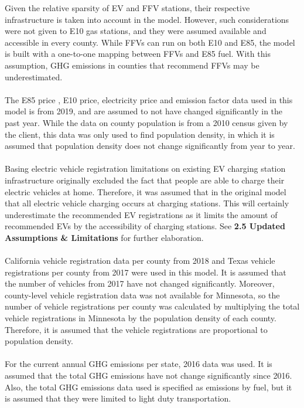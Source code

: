 \documentclass[answers]{exam}
\begin{document}
Given the relative sparsity of EV and FFV stations, their respective infrastructure is taken into account in the model. However, such considerations were not given to E10 gas stations, and they were assumed available and accessible in every county. While FFVs can run on both E10 and E85, the model is built with a one-to-one mapping between FFVs and E85 fuel. With this assumption, GHG emissions in counties that recommend FFVs may be underestimated. 
\\ ~\\
 The E85 price \cite{E85 Prices}, E10 price, electricity price and emission factor data used in this model is from 2019, and are assumed to not have changed significantly in the past year. While the data on county population is from a 2010 census given by the client, this data was only used to find population density, in which it is assumed that population density does not change significantly from year to year. 
\\ ~\\
Basing electric vehicle registration limitations on existing EV charging station infrastructure originally excluded the fact that people are able to charge their electric vehicles at home. Therefore, it was assumed that in the original model that all electric vehicle charging occurs at charging stations. This will certainly underestimate the recommended EV registrations as it limits the amount of recommended EVs by the accessibility of charging stations. See \textbf{2.5 Updated Assumptions \& Limitations} for further elaboration.
\\ ~\\
California vehicle registration data per county from 2018\cite{cadmv} and Texas vehicle registrations per county from 2017\cite{txdmv} were used in this model.
It is assumed that the number of vehicles from 2017 have not changed significantly. Moreover, county-level vehicle registration data was not available for Minnesota, so the number of vehicle registrations per county was calculated by multiplying the total vehicle registrations in Minnesota\cite{Kaul} by the population density of each county. Therefore, it is assumed that the vehicle registrations are proportional to population density.
\\ ~\\
For the current annual GHG emissions per state, 2016 data was used\cite{US energy info}. It is assumed that the total GHG emissions have not change significantly since 2016. Also, the total GHG emissions data used is specified as emissions by fuel, but it is assumed that they were limited to light duty transportation.
\end{document}
